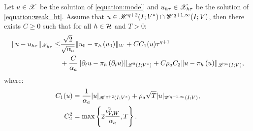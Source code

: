\begin{theorem} \label{theorem:estimate_ht}
    Let $u \in \mathscr{X}$ be the solution of \cref{equation:model} and $u_{h \tau} \in \mathscr{X}_{h \tau}$ be the solution of \cref{equation:weak_ht}. Assume that $u \in \mathscr{H}^{q + 2}(I; V^*) \cap \mathscr{W}^{q + 1, \infty}(I; V)$, then there exists $C \geq 0$ such that for all $h \in \mathcal{H}$ and $T > 0$:
    \begin{align}
        \lVert u - u_{h \tau} \rVert_{\mathscr{X}_{h \tau}} \leq & \frac{\sqrt{2}}{\sqrt{\alpha_{a}}} \lVert u_0 - \pi_h \left( u_0 \right) \rVert_W + C C_1(u) \tau^{q + 1} \label{eq:estimates_ht} \\
        & + \frac{C}{\alpha_{a}} \lVert \partial_t u - \pi_h \left( \partial_t u \right) \rVert_{\mathscr{L}^{2}(I; V^*)} + C \rho_{a} C_2 \lVert u - \pi_h \left( u \right) \rVert_{\mathscr{L}^{\infty}(I; V)}, \notag
    \end{align}
    where:
    \begin{align}
        C_1(u) & = \frac{1}{\alpha_{a}} \lvert u \rvert_{\mathscr{H}^{q + 2}(I; V^*)} + \rho_{a} \sqrt{T} \lvert u \rvert_{\mathscr{W}^{q + 1, \infty}(I; V)}, \\
        C_2^2 & = \max \left\{ 2 \frac{\iota_{V, W}^2}{\alpha_{a}}, T \right\}.
    \end{align}
\end{theorem}

